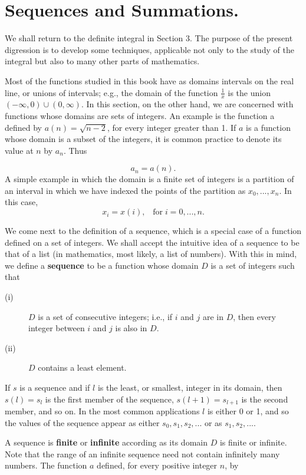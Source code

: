 \section{Sequences and Summations.} We shall return to the definite integral in Section 3. The purpose of the present digression is to develop some techniques, applicable not only to the study of the integral but also to many other parts of mathematics.

Most of the functions studied in this book have as domains intervals on the real line, or unions of intervals; e.g., the domain of the function $\frac{1}{x}$ is the union $(-\infty, 0) \cup (0, \infty)$. In this section, on the other hand, we are concerned with functions whose domains are sets of integers. An example is the function a defined by $a(n) = \sqrt{n - 2}$, for every integer greater than 1. If $a$ is a function whose domain is a subset of the integers, it is common practice to denote its value at $n$ by $a_n$. Thus

$$
a_n = a(n).
$$
\noindent A simple example in which the domain is a finite set of integers is a partition of an interval in which we have indexed the points of the partition as $x_0, . . ., x_n$. In this case,
$$
x_i = x(i), \;\;\; \mbox{for}\; i = 0, . . ., n.
$$

We come next to the definition of a sequence, which is a special case of a function defined on a set of integers. We shall accept the intuitive idea of a sequence to be that of a list (in mathematics, most likely, a list of numbers). With this in mind, we define a \textbf{sequence} to be a function whose domain $D$ is a set of integers such that
\medskip


\begin{description}
\item [(i)] $D$ is a set of consecutive integers; i.e., if $i$ and $j$ are in $D$, 
then every integer between $i$ and $j$ is also in $D$.
\item [(ii)] $D$ contains a least element.
\end{description}

If $s$ is a sequence and if $l$ is the least, or smallest, integer in its domain, then $s(l) = s_{l}$ is the first member of the sequence, $s(l + 1) = s_{l + 1}$ is the second member, and so on. In the most common applications $l$ is either 0 or 1, and so the values of the sequence appear as either $s_0, s_1, s_2,...$ or as $s_1, s_2, ...$.

A sequence is \textbf{finite} or \textbf{infinite} according as its domain $D$ is finite or infinite. Note that the range of an infinite sequence need not contain infinitely many numbers. The function $a$ defined, for every positive integer $n$, by

